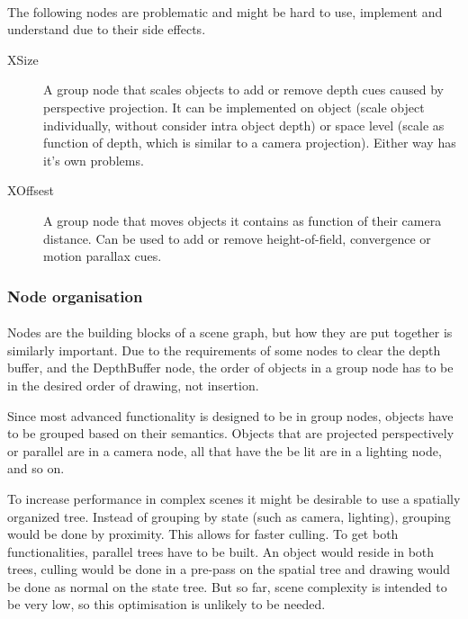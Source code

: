 \paragraph{}
The following nodes are problematic and might be hard to use, implement and understand due to their side effects.

\begin{description}
\item[XSize] A group node that scales objects to add or remove depth cues caused by perspective projection. It can be implemented on object (scale object individually, without consider intra object depth) or space level (scale  as function of depth, which is similar to a camera projection). Either way has it's own problems.
\item[XOffsest] A group node that moves objects it contains as function of their camera distance. Can be used to add or remove height-of-field, convergence or motion parallax cues.
\end{description}

\subsubsection{Node organisation}
\paragraph{}
Nodes are the building blocks of a scene graph, but how they are put together is similarly important. Due to the requirements of some nodes to clear the depth buffer, and the DepthBuffer node, the order of objects in a group node has to be in the desired order of drawing, not insertion.

Since most advanced functionality is designed to be in group nodes, objects have to be grouped based on their semantics.
Objects that are projected perspectively or parallel are in a camera node,
all that have the be lit are in a lighting node, and so on.

To increase performance in complex scenes it might be desirable to use a spatially organized tree. Instead of grouping by state (such as camera, lighting), grouping would be done by proximity.
This allows for faster culling.
To get both functionalities, parallel trees have to be built.
An object would reside in both trees, culling would be done in a pre-pass on the spatial tree and drawing would be done as normal on the state tree.
But so far, scene complexity is intended to be very low, so this optimisation is unlikely to be needed.


